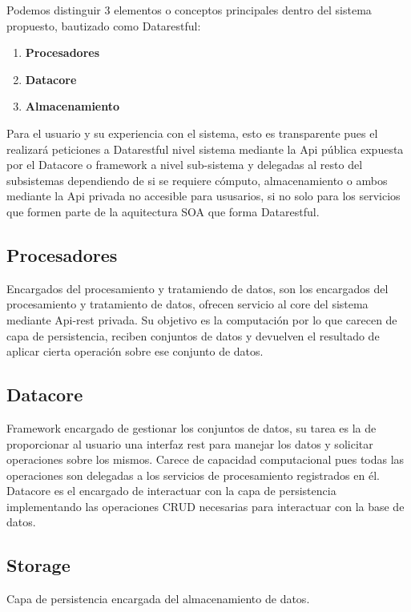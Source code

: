 \documentclass[a4paper,11pt]{book}
\begin{document}
Podemos distinguir 3 elementos o conceptos principales dentro del sistema propuesto, bautizado como Datarestful:

\begin{enumerate}
\item \textbf{Procesadores}
\item \textbf{Datacore}
\item \textbf{Almacenamiento}
\end{enumerate}


Para el usuario y su experiencia con el sistema, esto es transparente pues el realizará peticiones a Datarestful nivel sistema mediante la Api pública expuesta por el Datacore o framework a nivel sub-sistema y delegadas al resto del subsistemas dependiendo de si se requiere cómputo, almacenamiento o ambos mediante la Api privada no accesible para ususarios, si no solo para los servicios que formen parte de la aquitectura SOA que forma Datarestful. 

\subsection{Procesadores}

Encargados del procesamiento y tratamiendo de datos, son los encargados del procesamiento y tratamiento de datos, ofrecen servicio al core del sistema mediante Api-rest privada. Su objetivo es la computación por lo que carecen de capa de persistencia, reciben conjuntos de datos y devuelven el resultado de aplicar cierta operación sobre ese conjunto de datos. 

\subsection{Datacore}

Framework encargado de gestionar los conjuntos de datos, su tarea es la de proporcionar al usuario una interfaz rest para manejar los datos y solicitar operaciones sobre los mismos. Carece de capacidad computacional pues todas las operaciones son delegadas a los servicios de procesamiento registrados en él. Datacore es el encargado de interactuar con la capa de persistencia implementando las operaciones CRUD necesarias para interactuar con la base de datos.  

\subsection{Storage}

Capa de persistencia encargada del almacenamiento de datos.  
\end{document}
